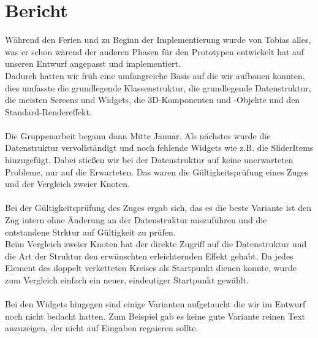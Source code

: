 \chapter{Bericht}
Während den Ferien und zu Beginn der Implementierung wurde von Tobias alles, was er schon wärend der anderen Phasen für den Prototypen entwickelt hat auf unseren Entwurf angepasst und implementiert.
\\
Dadurch hatten wir früh eine umfangreiche Basis auf die wir aufbauen konnten, dies umfasste die grundlegende Klassenstruktur, die grundlegende Datenstruktur, die meisten Screens und Widgets, die 3D-Komponenten und -Objekte und den Standard-Rendereffekt.
\\\\
Die Gruppenarbeit begann dann Mitte Januar.
Als nächstes wurde die Datenstruktur vervollständigt und noch fehlende Widgets wie z.B. die SliderItems hinzugefügt.
Dabei stießen wir bei der Datenstruktur auf keine unerwarteten Probleme, nur auf die Erwarteten.
Das waren die Gültigkeitsprüfung eines Zuges und der Vergleich zweier Knoten.
\\\\
Bei der Gültigkeitsprüfung des Zuges ergab sich, das es die beste Variante ist den Zug intern ohne Änderung an der Datenstruktur auszuführen und die entstandene Strktur auf Gültigkeit zu prüfen.
\\
Beim Vergleich zweier Knoten hat der direkte Zugriff auf die Datenstruktur und die Art der Struktur den erwünschten erleichternden Effekt gehabt. Da jedes Element des doppelt verketteten Kreises als Startpunkt dienen konnte, wurde zum Vergleich einfach ein neuer, eindeutiger Startpunkt gewählt.
\\\\
Bei den Widgets hingegen sind einige Varianten aufgetaucht die wir im Entwurf noch nicht bedacht hatten. Zum Beispiel gab es keine gute Variante reinen Text anzuzeigen, der nicht auf Eingaben regaieren sollte.
\\\\


